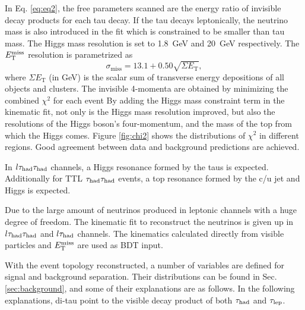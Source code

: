 %

In Eq. \ref{eq:eq2}, the free parameters scanned are the energy ratio of invisible decay products for each tau decay. If the tau decays leptonically, the neutrino mass is also introduced in the fit which is constrained to be smaller than tau mass.
The Higgs mass resolution is set to 1.8~GeV and 20~GeV respectively. The $E_{\text{T}}^{\text{miss}}$ resolution is parametrized as
\begin{equation}
\sigma_{\text{miss}}=13.1 + 0.50\sqrt{\Sigma E_\text{T}},
\label{eq:eq7}
\end{equation}
where $\Sigma E_\text{T}$ (in GeV) is the scalar sum of transverse energy depositions of all objects and clusters. The invisible 4-momenta are obtained by minimizing the combined $\chi^2$ for each event By adding the Higgs mass constraint term in the kinematic fit, not only is the Higgs mass resolution improved, but also the resolutions of the Higgs boson's four-momentum, and the mass of the top from which the Higgs comes. Figure \ref{fig:chi2} shows the distributions of $\chi^2$ in different regions. Good agreement between data and background predictions are achieved.



In $l\tau_\text{had}{}\tau_\text{had}$ channels, a Higgs resonance formed by the taus is expected. Additionally for TTL $\tau_\text{had}{}\tau_\text{had}$ events, a top resonance formed by the c/u jet and Higgs is expected.

Due to the large amount of neutrinos produced in leptonic channels with a huge degree of freedom. The kinematic fit to reconstruct the neutrinos is given up in $l\tau_\text{had}{}\tau_\text{had}$ and $l\tau_\text{had}$ channels. The kinematics calculated directly from visible particles and $E_{\text{T}}^{\text{miss}}$ are used as BDT input.

With the event topology reconstructed, a number of variables are defined for signal and background separation. Their distributions can be found in Sec. \ref{sec:background}, and some of their explanations are as follows. In the following explanations, di-tau point to the visible decay product of both $\tau_\text{had}$ and $\tau_\text{lep}$.


